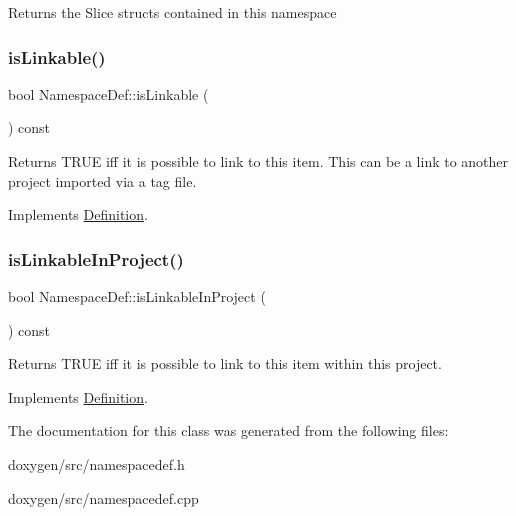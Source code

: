 Returns the Slice structs contained in this namespace \mbox{\label{class_namespace_def_a733e21e2422707a338b42b2c4e2ab37b}} 
\subsubsection{\texorpdfstring{isLinkable()}{isLinkable()}}
{\footnotesize\ttfamily bool Namespace\+Def\+::is\+Linkable (\begin{DoxyParamCaption}{ }\end{DoxyParamCaption}) const\hspace{0.3cm}{\ttfamily [virtual]}}

Returns T\+R\+UE iff it is possible to link to this item. This can be a link to another project imported via a tag file. 

Implements \mbox{\hyperlink{class_definition_a4002fd79c2d4dcf667c37c83d4214deb}{Definition}}.

\mbox{\label{class_namespace_def_a3d9655e111c40aa7005ded973d6a8e89}} 
\subsubsection{\texorpdfstring{isLinkableInProject()}{isLinkableInProject()}}
{\footnotesize\ttfamily bool Namespace\+Def\+::is\+Linkable\+In\+Project (\begin{DoxyParamCaption}{ }\end{DoxyParamCaption}) const\hspace{0.3cm}{\ttfamily [virtual]}}

Returns T\+R\+UE iff it is possible to link to this item within this project. 

Implements \mbox{\hyperlink{class_definition_a845891c7206d40c3664b562636cdf9fc}{Definition}}.



The documentation for this class was generated from the following files\+:\begin{DoxyCompactItemize}
\item 
doxygen/src/namespacedef.\+h\item 
doxygen/src/namespacedef.\+cpp\end{DoxyCompactItemize}
